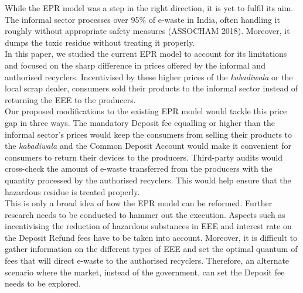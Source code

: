 \documentclass[a4paper, 12pt]{article}
\begin{document}
                     While the EPR model was a step in the right direction, it is yet to fulfil its aim. The informal sector processes over 95\% of e-waste in India, often handling it roughly without appropriate safety measures (ASSOCHAM 2018). Moreover, it dumps the toxic residue without treating it properly.\\ 
                    
                    In this paper, we studied the current EPR model to account for its limitations and focused on the sharp difference in prices offered by the informal and authorised recyclers. Incentivised by these higher prices of the \textit{kabadiwala} or the local scrap dealer, consumers sold their products to the informal sector instead of returning the EEE to the producers.\\
                    
                    Our proposed modifications to the existing EPR model would tackle this price gap in three ways. The mandatory Deposit fee equalling or higher than the informal sector’s prices would keep the consumers from selling their products to the \textit{kabadiwala} and the Common Deposit Account would make it convenient for consumers to return their devices to the producers. Third-party audits would cross-check the amount of e-waste transferred from the producers with the quantity processed by the authorised recyclers. This would help ensure that the hazardous residue is treated properly.\\
                    
                    This is only a broad idea of how the EPR model can be reformed. Further research needs to be conducted to hammer out the execution. Aspects such as incentivising the reduction of hazardous substances in EEE and interest rate on the Deposit Refund fees have to be taken into account. Moreover, it is difficult to gather information on the different types of EEE and set the optimal quantum of fees that will direct e-waste to the authorised recyclers. Therefore, an alternate scenario where the market, instead of the government, can set the Deposit fee needs to be explored.\\ 
         

	\printbibliography
         
         
\end{document}
